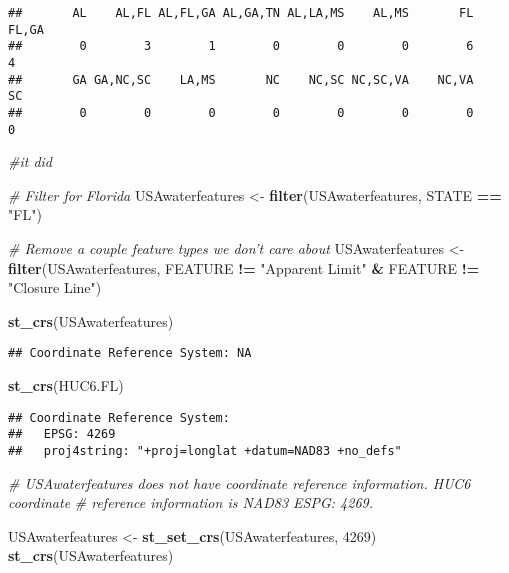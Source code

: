 \documentclass[]{article}
\newenvironment{Shaded}{\begin{snugshade}}{\end{snugshade}}
\newcommand{\CommentTok}[1]{\textcolor[rgb]{0.56,0.35,0.01}{\textit{#1}}}
\newcommand{\DecValTok}[1]{\textcolor[rgb]{0.00,0.00,0.81}{#1}}
\newcommand{\KeywordTok}[1]{\textcolor[rgb]{0.13,0.29,0.53}{\textbf{#1}}}
\newcommand{\NormalTok}[1]{#1}
\newcommand{\OperatorTok}[1]{\textcolor[rgb]{0.81,0.36,0.00}{\textbf{#1}}}
\newcommand{\StringTok}[1]{\textcolor[rgb]{0.31,0.60,0.02}{#1}}
\begin{document}
\begin{verbatim}
##       AL    AL,FL AL,FL,GA AL,GA,TN AL,LA,MS    AL,MS       FL    FL,GA 
##        0        3        1        0        0        0        6        4 
##       GA GA,NC,SC    LA,MS       NC    NC,SC NC,SC,VA    NC,VA       SC 
##        0        0        0        0        0        0        0        0
\end{verbatim}

\begin{Shaded}
\begin{Highlighting}[]
\CommentTok{#it did}

\CommentTok{# Filter for Florida}
\NormalTok{USAwaterfeatures <-}\StringTok{ }\KeywordTok{filter}\NormalTok{(USAwaterfeatures, STATE }\OperatorTok{==}\StringTok{ "FL"}\NormalTok{)}

\CommentTok{# Remove a couple feature types we don't care about}
\NormalTok{USAwaterfeatures <-}\StringTok{ }\KeywordTok{filter}\NormalTok{(USAwaterfeatures, FEATURE }\OperatorTok{!=}\StringTok{ "Apparent Limit"} \OperatorTok{&}\StringTok{ }\NormalTok{FEATURE }\OperatorTok{!=}\StringTok{ "Closure Line"}\NormalTok{)}

\KeywordTok{st_crs}\NormalTok{(USAwaterfeatures)}
\end{Highlighting}
\end{Shaded}

\begin{verbatim}
## Coordinate Reference System: NA
\end{verbatim}

\begin{Shaded}
\begin{Highlighting}[]
\KeywordTok{st_crs}\NormalTok{(HUC6.FL)}
\end{Highlighting}
\end{Shaded}

\begin{verbatim}
## Coordinate Reference System:
##   EPSG: 4269 
##   proj4string: "+proj=longlat +datum=NAD83 +no_defs"
\end{verbatim}

\begin{Shaded}
\begin{Highlighting}[]
\CommentTok{# USAwaterfeatures does not have coordinate reference information. HUC6 coordinate}
\CommentTok{# reference information is NAD83 ESPG: 4269.}

\NormalTok{USAwaterfeatures <-}\StringTok{ }\KeywordTok{st_set_crs}\NormalTok{(USAwaterfeatures, }\DecValTok{4269}\NormalTok{)}
\KeywordTok{st_crs}\NormalTok{(USAwaterfeatures)}
\end{Highlighting}
\end{Shaded}
\end{document}
